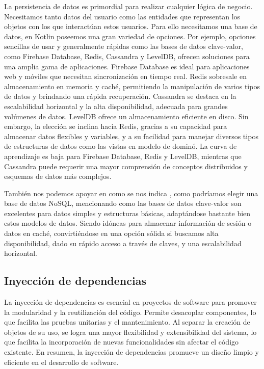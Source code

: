 La persistencia de datos es primordial para realizar cualquier lógica de negocio. Necesitamos tanto 
datos del usuario como las entidades que representan los objetos con los que interactúan estos 
usuarios. Para ello necesitamos una base de datos, en Kotlin poseemos una gran variedad de opciones. Por 
ejemplo, opciones sencillas de usar y generalmente rápidas como las bases de datos clave-valor, como Firebase 
Database, Redis, Cassandra y LevelDB, ofrecen soluciones para una amplia gama de aplicaciones. Firebase 
Database es ideal para aplicaciones web y móviles que necesitan sincronización en tiempo real. Redis 
sobresale en almacenamiento en memoria y caché, permitiendo la manipulación de varios tipos de datos y 
brindando una rápida recuperación. Cassandra se destaca en la escalabilidad horizontal y la alta 
disponibilidad, adecuada para grandes volúmenes de datos. LevelDB ofrece un almacenamiento eficiente en 
disco. Sin embargo, la elección se inclina hacia Redis, gracias a su capacidad para almacenar datos flexibles 
y variables, y a su facilidad para manejar diversos tipos de estructuras de datos como las vistas en modelo 
de dominó. La curva de aprendizaje es baja para Firebase Database, Redis y LevelDB, mientras que Cassandra 
puede requerir una mayor comprensión de conceptos distribuidos y esquemas de datos más complejos.

También nos podemos apoyar en como se nos indica \cite{NosqlDist}, como podríamos elegir una base de datos 
NoSQL, mencionando como las bases de datos clave-valor son excelentes para datos simples y estructuras 
básicas, adaptándose bastante bien estos modelos de datos. Siendo idóneas para almacenar información de 
sesión o datos en caché, convirtiéndose en una opción sólida si buscamos alta disponibilidad, dado su rápido 
acceso a través de claves, y una escalabilidad horizontal.

\subsection{Inyección de dependencias}

La inyección de dependencias es esencial en proyectos de software \cite{DIart}\cite{BenDI} para 
promover la modularidad y la reutilización del código. Permite desacoplar componentes, lo que facilita 
las pruebas unitarias y el mantenimiento. Al separar la creación de objetos de su uso, se logra una 
mayor flexibilidad y extensibilidad del sistema, lo que facilita la incorporación de nuevas 
funcionalidades sin afectar el código existente. En resumen, la inyección de dependencias promueve un 
diseño limpio y eficiente en el desarrollo de software.

